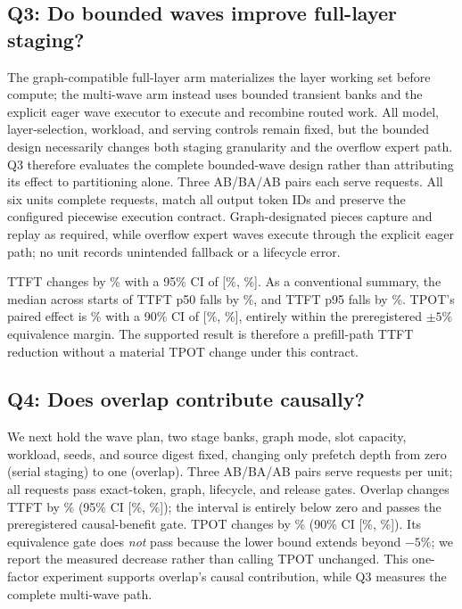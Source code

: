 \subsection{Q3: Do bounded waves improve full-layer staging?}

The graph-compatible full-layer arm materializes the layer working set before
compute; the multi-wave arm instead uses bounded transient banks and the
explicit eager wave executor to execute and recombine routed work. All model,
layer-selection, workload, and serving controls remain fixed, but the bounded
design necessarily changes both staging granularity and the overflow expert
path. Q3 therefore evaluates the complete bounded-wave design rather than
attributing its effect to partitioning alone. Three AB/BA/AB pairs each serve
\BoundedRequestsPerUnit{} requests. All six units complete
\BoundedTotalRequests{} requests, match all \BoundedTotalTokens{} output token
IDs and preserve the configured piecewise execution contract. Graph-designated
pieces capture and replay as required, while overflow expert waves execute
through the explicit eager path; no unit records unintended fallback or a
lifecycle error.

TTFT changes by \BoundedTTFTEffect\% with a 95\% CI of
[\BoundedTTFTLower\%, \BoundedTTFTUpper\%]. As a conventional summary, the
median across starts of TTFT p50 falls by
\BoundedRepeatMedianTTFTReduction\%, and TTFT p95 falls by
\BoundedRepeatTailTTFTReduction\%. TPOT's paired effect is
\BoundedTPOTEffect\% with a 90\% CI of
[\BoundedTPOTLower\%, \BoundedTPOTUpper\%], entirely within the
preregistered $\pm5\%$ equivalence margin. The supported result is therefore a
prefill-path TTFT reduction without a material TPOT change under this contract.

\subsection{Q4: Does overlap contribute causally?}

We next hold the wave plan, two stage banks, graph mode, slot capacity,
workload, seeds, and source digest fixed, changing only prefetch depth from
zero (serial staging) to one (overlap). Three AB/BA/AB pairs serve
\OverlapRequestsPerUnit{} requests per unit; all \OverlapTotalRequests{}
requests pass exact-token, graph, lifecycle, and release
gates. Overlap changes TTFT by \OverlapTTFTEffect\% (95\% CI
[\OverlapTTFTLower\%, \OverlapTTFTUpper\%]); the interval is entirely below
zero and passes the preregistered causal-benefit gate. TPOT changes by
\OverlapTPOTEffect\% (90\% CI [\OverlapTPOTLower\%,
\OverlapTPOTUpper\%]). Its equivalence gate does \emph{not} pass because the
lower bound extends beyond $-5\%$; we report the measured decrease rather than
calling TPOT unchanged. This one-factor experiment supports overlap's causal
contribution, while Q3 measures the complete multi-wave path.


